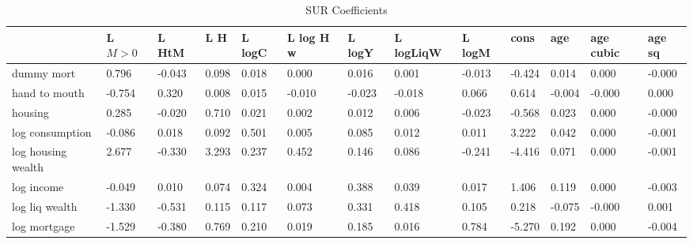 \begin{table}[htbp]
	\caption{\label{clabel} SUR Coefficients}\centering\medskip
\begin{tabular}{lllllllllllll} \hline \hline
 & L $M>0$  & L HtM  & L H  & L logC  & L log H w  & L logY  & L logLiqW  & L logM  & cons  & age  & age cubic  & age sq  \\  \hline 
dummy mort &     0.796 &    -0.043 &     0.098 &     0.018 &     0.000 &     0.016 &     0.001 &    -0.013 &    -0.424 &     0.014 &     0.000 &    -0.000 \\  
hand to mouth &    -0.754 &     0.320 &     0.008 &     0.015 &    -0.010 &    -0.023 &    -0.018 &     0.066 &     0.614 &    -0.004 &    -0.000 &     0.000 \\  
housing &     0.285 &    -0.020 &     0.710 &     0.021 &     0.002 &     0.012 &     0.006 &    -0.023 &    -0.568 &     0.023 &     0.000 &    -0.000 \\  
log consumption &    -0.086 &     0.018 &     0.092 &     0.501 &     0.005 &     0.085 &     0.012 &     0.011 &     3.222 &     0.042 &     0.000 &    -0.001 \\  
log housing wealth &     2.677 &    -0.330 &     3.293 &     0.237 &     0.452 &     0.146 &     0.086 &    -0.241 &    -4.416 &     0.071 &     0.000 &    -0.001 \\  
log income &    -0.049 &     0.010 &     0.074 &     0.324 &     0.004 &     0.388 &     0.039 &     0.017 &     1.406 &     0.119 &     0.000 &    -0.003 \\  
log liq wealth &    -1.330 &    -0.531 &     0.115 &     0.117 &     0.073 &     0.331 &     0.418 &     0.105 &     0.218 &    -0.075 &    -0.000 &     0.001 \\  
log mortgage &    -1.529 &    -0.380 &     0.769 &     0.210 &     0.019 &     0.185 &     0.016 &     0.784 &    -5.270 &     0.192 &     0.000 &    -0.004 \\  
\hline \hline \end{tabular}
\end{table}

